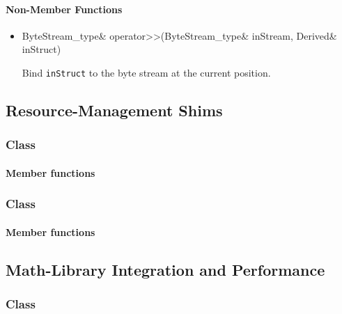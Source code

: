 \paragraph{Non-Member Functions}

\begin{itemize}
	\item
		\begin{cppsnippet}
		ByteStream_type& operator>>(ByteStream_type& inStream, Derived& inStruct)
		\end{cppsnippet}
		
		Bind \texttt{inStruct} to the byte stream at the current position.
\end{itemize}



\subsection{Resource-Management Shims}

\subsubsection[Class Allocator]{Class }

\paragraph{Member functions}

\subsubsection[Class NativeRandomNumberGenerator]{Class }

\paragraph{Member functions}


\subsection{Math-Library Integration and Performance}

\subsubsection[Class HandleMap]{Class }

